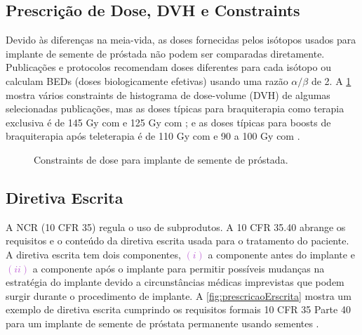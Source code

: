 \documentclass[11pt,a4paper]{article}
\newcounter{exemplo}
\begin{document}
\subsection*{Prescrição de Dose, DVH e Constraints}

	Devido às diferenças na meia-vida, as doses fornecidas pelos isótopos usados para implante de semente de próstada não podem ser comparadas diretamente. Publicações e protocolos recomendam doses diferentes para cada isótopo ou calculam BEDs (doses biologicamente efetivas) usando uma razão $\alpha/\beta$ de 2. A \ref{fig:constraintProstata} mostra vários constraints de histograma de dose-volume (DVH) de algumas selecionadas publicações, mas as doses típicas para braquiterapia como terapia exclusiva é de 145 Gy com  e 125 Gy com ; e as doses típicas para boosts de braquiterapia após teleterapia é de 110 Gy com  e 90 a 100 Gy com .

	\begin{figure}[h]
		\centering
		\caption{Constraints de dose para implante de semente de próstada.}
		\label{fig:constraintProstata}
	\end{figure}

\subsection*{Diretiva Escrita}

	A NCR (10 CFR 35) regula o uso de subprodutos. A 10 CFR 35.40 abrange os requisitos e o conteúdo da diretiva escrita usada para o tratamento do paciente. A diretiva escrita tem dois componentes, \textcolor{MediumOrchid}{$(i)$} a componente antes do implante e \textcolor{MediumOrchid}{$(ii)$} a componente após o implante para permitir possíveis mudanças na estratégia do implante devido a circunstâncias médicas imprevistas que podem surgir durante o procedimento de implante. A \ref{fig:prescricaoErscrita} mostra um exemplo de diretiva escrita cumprindo os requisitos formais 10 CFR 35 Parte 40 para um implante de semente de próstata permanente usando sementes .
\end{document}

